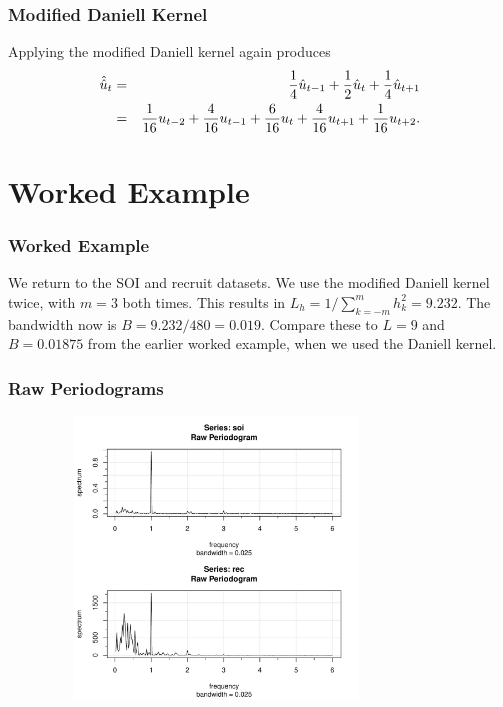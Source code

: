 \documentclass[%
xcolor=pdftex]{beamer}
\begin{document}
\begin{frame}[fragile]
\frametitle{Modified Daniell Kernel}

Applying the modified Daniell kernel again produces
\begin{eqnarray*}
\hat{\hat{u}}_t &=& \frac{1}{4} \hat{u}_{t-1}+\frac{1}{2}
\hat{u}_{t}+\frac{1}{4} \hat{u}_{t+1}\cr
&=&\frac{1}{16} u_{t-2}+\frac{4}{16} u_{t-1}+\frac{6}{16} u_{t}
+\frac{4}{16} u_{t+1}+\frac{1}{16} u_{t+2}.
\end{eqnarray*}


\end{frame}




\section{Worked Example}
\frame{\tableofcontents[currentsection]}

\begin{frame}
\frametitle{Worked Example}

We return to the SOI and recruit datasets. We use the modified Daniell kernel twice, with $m=3$ both times. This results in $L_h = 1/\sum_{k=-m}^{m} h_k^2 = 9.232$. The bandwidth now is $B = 9.232/480 = 0.019$. Compare these to $L=9$ and $B=0.01875$ from the earlier worked example, when we used the Daniell kernel.

\end{frame}

\begin{frame}
\frametitle{Raw Periodograms}

\includegraphics[width=110mm, height=75mm]{periodogram.pdf}

\end{frame}
\end{document}
